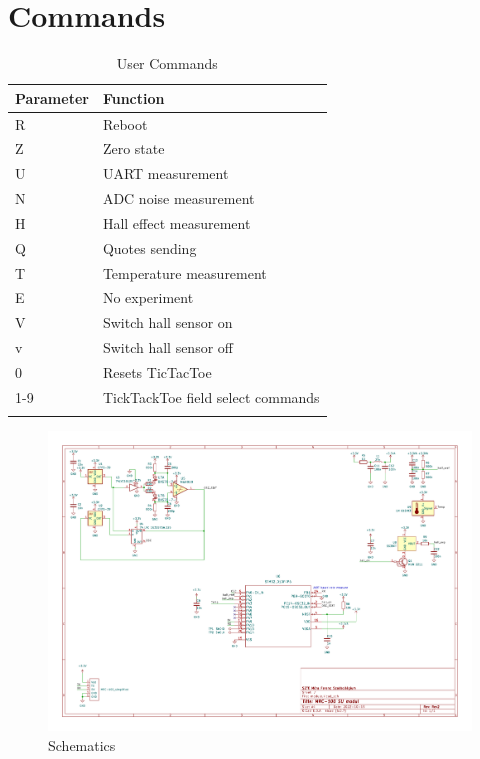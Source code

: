 \documentclass[10pt]{datasheet}
\begin{document}
\section{Commands}
\begin{table}[h]
\caption{User Commands}
\begin{tabularx}{\textwidth}{l | X}
    \thickhline
    \textbf{Parameter} & \textbf{Function} \hspace{5cm} \\
    \hline
   	R & Reboot \\
	Z & Zero state \\
	U & UART measurement\\
	N & ADC noise measurement\\
	H & Hall effect measurement\\
	Q & Quotes sending\\
	T & Temperature measurement\\
	E & No experiment\\
	V & Switch hall sensor on\\
	v & Switch hall sensor off\\
	0 & Resets TicTacToe\\
	1-9 & TickTackToe field select commands\\
    \thickhline
\end{tabularx}
\end{table}



\begin{figure}
	\centering
	\includegraphics[width=1.2\textwidth,angle = 90]{sch}
	\caption{Schematics}
\end{figure}
\end{document}
